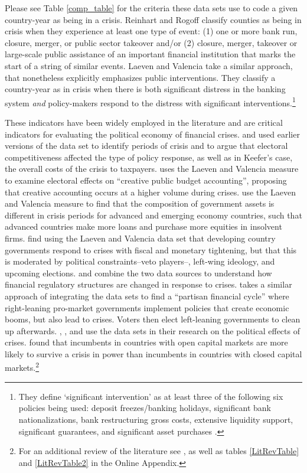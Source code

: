 \documentclass[]{article}
\begin{document}
Please see Table \ref{comp_table} for the criteria these data sets use to code a given country-year as being in a crisis. Reinhart and Rogoff \citeyearpar[10]{Reinhart2009,ReinhartRog2010} classify counties as being in crisis when they experience at least one type of event: (1) one or more bank run, closure, merger, or public sector takeover and/or (2) closure, merger, takeover or large-scale public assistance of an important financial institution that marks the start of a string of similar events. Laeven and Valencia \citeyearpar[228]{laeven2013} take a similar approach, that nonetheless explicitly emphasizes public interventions. They classify a country-year as in crisis when there is both significant distress in the banking system \emph{and} policy-makers respond to the distress with significant interventions.\footnote{They define `significant intervention' as at least three of the following six policies being used: deposit freezes/banking holidays, significant bank nationalizations, bank restructuring gross costs, extensive liquidity support, significant guarantees, and significant asset purchases \cite[][229]{laeven2013}.}

These indicators have been widely employed in the literature and are critical indicators for evaluating the political economy of financial crises. \cite{Keefer2007} and \cite{Rosas2006,Rosas2009} used earlier versions of the \cite{laeven2013} data set to identify periods of crisis and to argue that electoral competitiveness affected the type of policy response, as well as in Keefer's case, the overall costs of the crisis to taxpayers. \cite{reischmann2015} uses the Laeven and Valencia measure to examine electoral effects on ``creative public budget accounting'', proposing that creative accounting occurs at a higher volume during crises. \cite{seiferling2015} use the Laeven and Valencia measure to find that the composition of government assets is different in crisis periods for advanced and emerging economy countries, such that advanced countries make more loans and purchase more equities in insolvent firms. \cite{ha2015} find using the Laeven and Valencia data set that developing country governments respond to crises with fiscal and monetary tightening, but that this is moderated by political constraints--veto players--, left-wing ideology, and upcoming elections. \cite{Gandrud2013,Gandrud2014} and \cite{Kleibl2013} combine the two data sources to understand how financial regulatory structures are changed in response to crises. \cite{broz2013} takes a similar approach of integrating the data sets to find a ``partisan financial cycle'' where right-leaning pro-market governments implement policies that create economic booms, but also lead to crises. Voters then elect left-leaning governments to clean up afterwards. \cite{CrespoTenorio2014}, \cite{Chwieroth2013}, and \cite{Pepinsky2012} use the data sets in their research on the political effects of crises. \cite{CrespoTenorio2014} found that incumbents in countries with open capital markets are more likely to survive a crisis in power than incumbents in countries with closed capital markets.\footnote{For an additional review of the literature see \cite{GandrudHallerberg2015}, as well as tables \ref{LitRevTable} and \ref{LitRevTable2} in the Online Appendix.}
\end{document}
